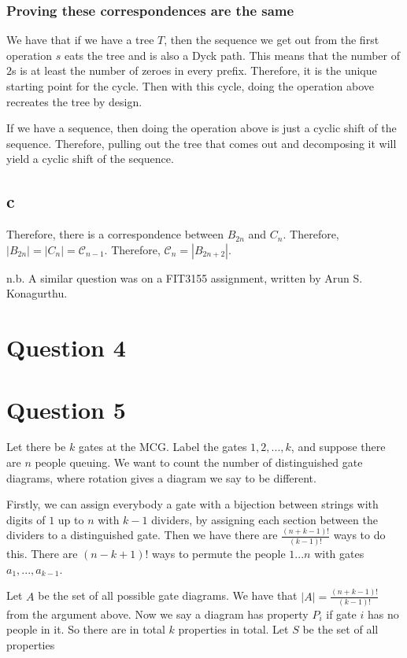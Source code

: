 \documentclass[]{article}
\theoremstyle{definition}
\numberwithin{theorem}{section}
\numberwithin{equation}{section}
\begin{document}
\subsubsection{Proving these correspondences are the same}
We have that if we have a tree $T$, then the sequence we get out from the first operation $s$ eats the tree and is also a Dyck path. This means that the number of $2$s is at least the number of zeroes in every prefix. Therefore, it is the unique starting point for the cycle. Then with this cycle, doing the operation above recreates the tree by design.

If we have a sequence, then doing the operation above is just a cyclic shift of the sequence. Therefore, pulling out the tree that comes out and decomposing it will yield a cyclic shift of the sequence. 

\subsection{c}
Therefore, there is a correspondence between $B_{2n}$ and $C_n$. Therefore, $|B_{2n}| = |C_n| = \mathcal{C}_{n - 1}$. Therefore, $\mathcal{C}_n = |B_{2n + 2}|$. 

n.b. A similar question was on a FIT3155 assignment, written by Arun S. Konagurthu.
\section{Question 4}

\section{Question 5}
Let there be $k$ gates at the MCG. Label the gates $1, 2, ..., k$, and suppose there are $n$ people queuing. We want to count the number of distinguished gate diagrams, where rotation gives a diagram we say to be different.

Firstly, we can assign everybody a gate with a bijection between strings with digits of $1$ up to $n$ with $k - 1$ dividers, by assigning each section between the dividers to a distinguished gate. Then we have there are $\frac{(n + k - 1)!}{(k - 1)!}$ ways to do this. There are $(n - k + 1)!$ ways to permute the people $1 ... n$ with gates $a_1, ..., a_{k - 1}$.

Let $A$ be the set of all possible gate diagrams. We have that $|A| = \frac{(n + k - 1)!}{(k - 1)!}$ from the argument above.
Now we say a diagram has property $P_i$ if gate $i$ has no people in it. So there are in total $k$ properties in total. Let $S$ be the set of all properties 
\end{document}
